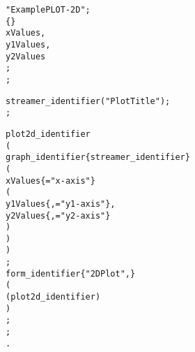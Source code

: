 
\begin{boxedminipage}[t]{\linewidth}
\begin{alltt}
\DESCRIPTION "Example PLOT-2D";
\DATAPOOL
  \REAL \{\EDITABLE\}
    xValues,
    y1Values,
    y2Values
  ;
\END \DATAPOOL;

\STREAMER
  streamer_identifier ("Plot Title");
\END \STREAMER;

\UIMANAGER
  \PLOTTWOD
    plot2d_identifier
    (
      graph_identifier \{streamer_identifier\}
      (
        xValues \{\LABEL="x-axis"\}
        (
          y1Values \{\YAXISONE, \LABEL="y1-axis"\},
          y2Values \{\YAXISONE, \LABEL="y2-axis"\}
        )
      )
    )
  ;
  \FORM
    form_identifier \{"2D Plot", \HIDECYCLE\}
    (
      ( plot2d_identifier )
    )
  ;
\END \UIMANAGER;
\END.
\end{alltt}
\end{boxedminipage}

%
\newpage


